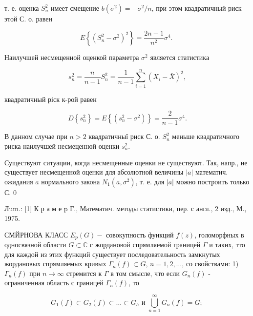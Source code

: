 \documentclass[10pt]{article}
\begin{document}
т. е. оценка $S_{n}^{2}$ имеет смещение $b\left(\sigma^{2}\right)=-\sigma^{2} / n$, при этом квадратичныӥ риск этой С. о. равен



\[

E\left\{\left(S_{n}^{2}-\sigma^{2}\right)^{2}\right\}=\frac{2 n-1}{n^{2}} \sigma^{4} \text {. }

\]



Наилучшей несмещенной оценкой параметра $\sigma^{2}$ является статистика



\[

s_{n}^{2}=\frac{n}{n-1} S_{n}^{2}=\frac{1}{n-1} \sum_{i=1}^{n}\left(X_{i}-\bar{X}\right)^{2},

\]



квадратичный ріск к-рой равен



\[

D\left\{s_{n}^{2}\right\}=E\left\{\left(s_{n}^{2}-\sigma^{2}\right)\right\}=\frac{2}{n-1} \sigma^{4} .

\]



В данном случае при $n>2$ квадратичныї риск С. о. $S_{n}^{2}$ меньше квадратичного риска наилучшей несмеценной оценки $s_{n}^{2}$.



Существуют ситуации, когда несмещенные оценки не существуют. Так, напр., не существует несмещенной оценки для абсолютной величины $|a|$ математич. ожидания $a$ нормального закона $N_{1}\left(a, \sigma^{2}\right)$, т. е. для $|a|$ можно построить только С. 0



Лum.: [1] К р а м е p Г., Математич. методы статистики, пер. с англ., 2 изд., М., 1975.



СМЙРНОВА КЛАСС $E_{p}(G)-$ совокупность функций $f(z)$, голоморфных в односвязной области $G \subset \mathbb{C}$ с жордановой спрямляемой границей $\Gamma$ и таких, тто для каждой из этих функций существует последовательность замкнутых жордановых спрямляемых кривых $\Gamma_{n}(f) \subset G$, $n=1,2, \ldots$, со свойствами: 1) $\Gamma_{n}(f)$ при $n \rightarrow \infty$ стремится к $\Gamma$ в том смысле, что если $G_{n}(f)$ - ограниченная область с границей $\Gamma_{n}(f)$, то



\[

G_{1}(f) \subset G_{2}(f) \subset \ldots \subset G_{h} \text { и } \bigcup_{n=1}^{\infty} G_{n}(f)=G \text {; }

\]
\end{document}

